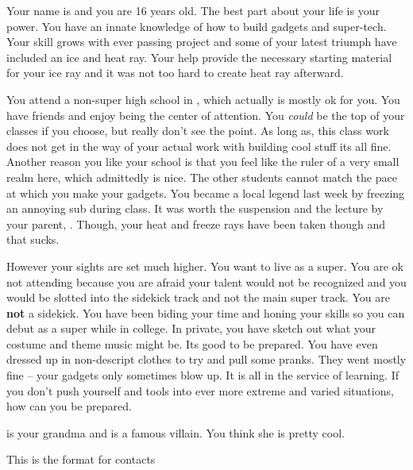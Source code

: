 \documentclass[char]{LRSguildcamp1}
\begin{document}
\name{\cTeen{}}



Your name is \cTeen{} and you are 16 years old. The best part about your life is your power. You have an innate knowledge of how to build gadgets and super-tech. Your skill grows with ever passing project and some of your latest triumph have included an ice and heat ray. Your \cOldest{\uncle} help provide the necessary starting material for your ice ray and it was not too hard to create heat ray afterward. 

You attend \pNormalSchool a non-super high school in \pCityArchitect, which actually is mostly ok for you. You have friends and enjoy being the center of attention. You \textsl{could} be the top of your classes if you choose, but really don't see the point. As long as, this class work does not get in the way of your actual work with building cool stuff its all fine. Another reason you like your school is that you feel like the ruler of a very small realm here, which admittedly is nice. The other students cannot match the pace at which you make your gadgets. You became a local legend last week by freezing an annoying sub during class. It was worth the suspension and the lecture by your parent, \cArchitect. Though, your heat and freeze rays have been taken though and that sucks. 

However your sights are set much higher. You want to live as a super. You are ok not attending \pSuperSchool because you are afraid your talent would not be recognized and you would be slotted into the sidekick track and not the main super track. You are \textbf{not} a sidekick. You have been biding your time and honing your skills so you can debut as a super while in college. In private, you have sketch out what your costume and theme music might be. Its good to be prepared. You have even dressed up in non-descript clothes to try and pull some pranks.  They went mostly fine -- your gadgets only sometimes blow up.  It is all in the service of learning. If you don't push yourself and tools into ever more extreme and varied situations, how can you be prepared.  

\cGrandma{} is your grandma and is a famous villain. You think she is pretty cool. 

\begin{itemz}[Goals]
	\item 
\end{itemz}

\begin{itemz}[Notes]
	\item 
\end{itemz}

\begin{contacts}
	\contact{}  This is the format for contacts 
\end{contacts}
\end{document}
